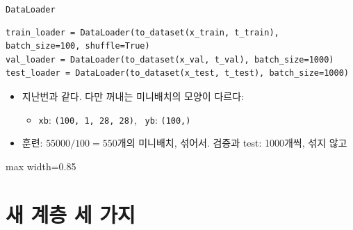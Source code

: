 \documentclass[aspectratio=169,11pt]{beamer}
\newcommand{\code}[1]{\texttt{#1}}
\begin{document}
\begin{frame}[fragile]{\code{DataLoader}}
\begin{lstlisting}
train_loader = DataLoader(to_dataset(x_train, t_train), batch_size=100, shuffle=True)
val_loader = DataLoader(to_dataset(x_val, t_val), batch_size=1000)
test_loader = DataLoader(to_dataset(x_test, t_test), batch_size=1000)
\end{lstlisting}
\begin{itemize}
\item 지난번과 같다. 다만 꺼내는 미니배치의 모양이 다르다:
\begin{itemize}
\item \code{xb}: \code{(100, 1, 28, 28)}, \ \code{yb}: \code{(100,)}
\end{itemize}
\item 훈련: $55000/100=550$개의 미니배치, 섞어서. 검증과 test: 1000개씩, 섞지 않고
\end{itemize}
\vskip2mm
\centering
\begin{adjustbox}{max width=0.85\linewidth}
\end{adjustbox}
\end{frame}

\section{새 계층 세 가지}
\end{document}
